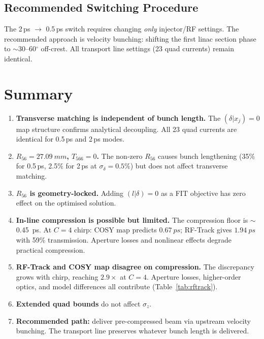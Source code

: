 \documentclass[11pt]{article}
\begin{document}
\subsection{Recommended Switching Procedure}

The 2\,ps $\to$ 0.5\,ps switch requires changing \emph{only} injector/RF
settings.  The recommended approach is velocity bunching: shifting the
first linac section phase to $\sim$30--60$^\circ$ off-crest.  All
transport line settings (23 quad currents) remain identical.


\section{Summary}

\begin{enumerate}
  \item \textbf{Transverse matching is independent of bunch length.}
    The $(\delta|x_j) = 0$ map structure confirms analytical decoupling.
    All 23 quad currents are identical for 0.5\,ps and 2\,ps modes.

  \item \textbf{$R_{56} = \SI{27.09}{mm}$, $T_{566} = 0$.}  The
    non-zero $R_{56}$ causes bunch lengthening (35\% for 0.5\,ps,
    2.5\% for 2\,ps at $\sigma_\delta = 0.5\%$) but does not affect
    transverse matching.

  \item \textbf{$R_{56}$ is geometry-locked.}  Adding $(l|\delta) = 0$
    as a FIT objective has zero effect on the optimised solution.

  \item \textbf{In-line compression is possible but limited.}  The
    compression floor is $\sim$\SI{0.45}{ps}.  At $C = 4$ chirp:
    COSY map predicts $\SI{0.67}{ps}$; RF-Track gives $\SI{1.94}{ps}$
    with 59\% transmission.  Aperture losses and nonlinear effects
    degrade practical compression.

  \item \textbf{RF-Track and COSY map disagree on compression.}
    The discrepancy grows with chirp, reaching $2.9\times$ at $C = 4$.
    Aperture losses, higher-order optics, and model differences all
    contribute (Table~\ref{tab:rftrack}).

  \item \textbf{Extended quad bounds} do not affect $\sigma_z$.

  \item \textbf{Recommended path:} deliver pre-compressed beam via
    upstream velocity bunching.  The transport line preserves whatever
    bunch length is delivered.
\end{enumerate}
\end{document}
